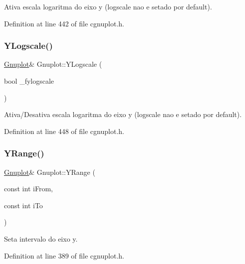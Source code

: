 Ativa escala logaritma do eixo y (logscale nao e setado por default). 



Definition at line 442 of file cgnuplot.\+h.

\mbox{\label{class_gnuplot_a6ab94815fbf0fabfa108cf659079828f}} 
\subsubsection{\texorpdfstring{Y\+Logscale()}{YLogscale()}\hspace{0.1cm}{\footnotesize\ttfamily [2/2]}}
{\footnotesize\ttfamily \hyperlink{class_gnuplot}{Gnuplot}\& Gnuplot\+::\+Y\+Logscale (\begin{DoxyParamCaption}\item[{bool}]{\+\_\+fylogscale }\end{DoxyParamCaption})\hspace{0.3cm}{\ttfamily [inline]}}



Ativa/\+Desativa escala logaritma do eixo y (logscale nao e setado por default). 



Definition at line 448 of file cgnuplot.\+h.

\mbox{\label{class_gnuplot_a266411505d17e3f85ceebd252b9e5fe9}} 
\subsubsection{\texorpdfstring{Y\+Range()}{YRange()}}
{\footnotesize\ttfamily \hyperlink{class_gnuplot}{Gnuplot}\& Gnuplot\+::\+Y\+Range (\begin{DoxyParamCaption}\item[{const int}]{i\+From,  }\item[{const int}]{i\+To }\end{DoxyParamCaption})\hspace{0.3cm}{\ttfamily [inline]}}



Seta intervalo do eixo y. 



Definition at line 389 of file cgnuplot.\+h.


